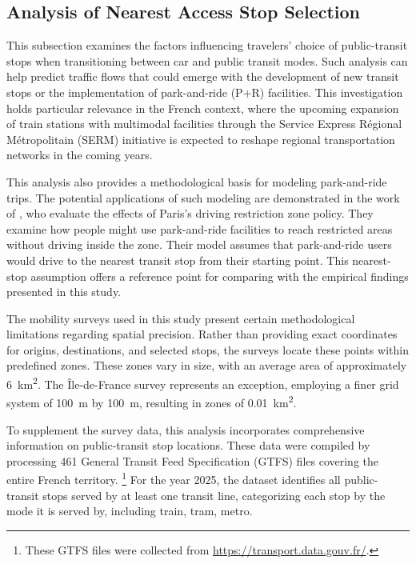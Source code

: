 \documentclass[3p,times,procedia]{elsarticle}
\begin{document}
\subsection{Analysis of Nearest Access Stop Selection}

This subsection examines the factors influencing travelers' choice of public-transit stops when transitioning between car and public transit modes.
Such analysis can help predict traffic flows that could emerge with the development of new transit stops or the implementation of park-and-ride (P+R) facilities.
This investigation holds particular relevance in the French context, where the upcoming expansion of train stations with multimodal facilities through the Service Express Régional Métropolitain (SERM) initiative is expected to reshape regional transportation networks in the coming years.

This analysis also provides a methodological basis for modeling park-and-ride trips.
The potential applications of such modeling are demonstrated in the work of \citet{Yin2023}, who evaluate the effects of Paris's driving restriction zone policy.
They examine how people might use park-and-ride facilities to reach restricted areas without driving inside the zone.
Their model assumes that park-and-ride users would drive to the nearest transit stop from their starting point.
This nearest-stop assumption offers a reference point for comparing with the empirical findings presented in this study.

The mobility surveys used in this study present certain methodological limitations regarding spatial precision.
Rather than providing exact coordinates for origins, destinations, and selected stops, the surveys locate these points within predefined zones.
These zones vary in size, with an average area of approximately \SI{6}{\kilo\meter\squared}.
The Île-de-France survey represents an exception, employing a finer grid system of \SI{100}{\meter} by \SI{100}{\meter}, resulting in zones of \SI{0.01}{\kilo\meter\squared}.

To supplement the survey data, this analysis incorporates comprehensive information on public-transit stop locations.
These data were compiled by processing 461 General Transit Feed Specification (GTFS) files covering the entire French territory.%
\footnote{These GTFS files were collected from \url{https://transport.data.gouv.fr/}.}
For the year 2025, the dataset identifies all public-transit stops served by at least one transit line, categorizing each stop by the mode it is served by, including train, tram, metro.
\end{document}
